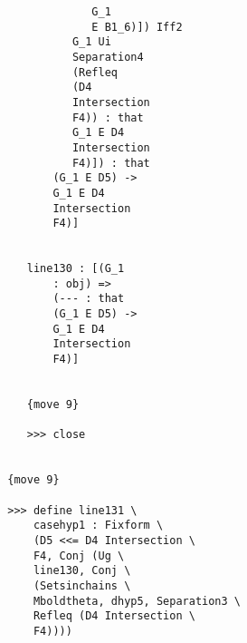 \documentclass[12pt]{article}
\begin{document}
\begin{verbatim}
                                        G_1 
                                        E B1_6)]) Iff2 
                                     G_1 Ui 
                                     Separation4 
                                     (Refleq 
                                     (D4 
                                     Intersection 
                                     F4)) : that 
                                     G_1 E D4 
                                     Intersection 
                                     F4)]) : that 
                                  (G_1 E D5) -> 
                                  G_1 E D4 
                                  Intersection 
                                  F4)]


                              line130 : [(G_1 
                                  : obj) => 
                                  (--- : that 
                                  (G_1 E D5) -> 
                                  G_1 E D4 
                                  Intersection 
                                  F4)]


                              {move 9}

                              >>> close


                           {move 9}

                           >>> define line131 \
                               casehyp1 : Fixform \
                               (D5 <<= D4 Intersection \
                               F4, Conj (Ug \
                               line130, Conj \
                               (Setsinchains \
                               Mboldtheta, dhyp5, Separation3 \
                               Refleq (D4 Intersection \
                               F4))))



\end{verbatim}
\end{document}
